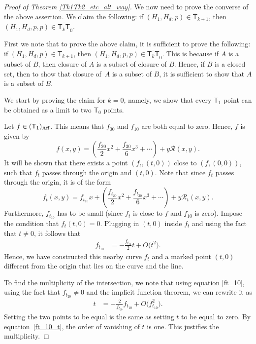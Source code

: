 \begin{proof}[Proof of Theorem \ref{Tk1Tk2_etc_alt_way}]
We now need to prove the converse of the above assertion.
We claim the following: if $(H_1, H_d, p) \in \overline{\mathsf{T}}_{k+1}$,
then $(H_1, H_d, p, p) \in \overline{\mathsf{T}_{k} \mathsf{T}}_0$.

First we note that to prove the above claim, it is sufficient to prove the following:
if $(H_1, H_d, p) \in \mathsf{T}_{k+1}$,
then $(H_1, H_d, p, p) \in \overline{\mathsf{T}_{k} \mathsf{T}}_0$.
This is because if $A$ is a subset of $B$, then closure of $A$ is a subset of
closure of $B$. Hence, if $B$ is a closed set, then to show that closure of~$A$
is a subset of $B$, it is sufficient to show that $A$ is a subset of $B$.

We start by proving the claim for $k = 0$, namely, we show that
every $\mathsf{T}_1$ point can be obtained as a limit to two $\mathsf{T}_0$ points.

Let $f \in (\mathsf{T}_1)_{\textnormal{Aff}}$. This means that $f_{00}$ and $f_{10}$ are both equal to zero.
Hence, $f$ is given by
\[
f(x, y)  =  \left(\frac{f_{20}}{2} x^2 + \frac{f_{30}}{6} x^3 + \cdots\right) + y \mathcal{R}(x, y).
\]
It will be shown that there exists a point $(f_t, (t, 0))$ close to $(f, (0, 0))$, such that
$f_t$ passes through the origin and $(t, 0)$. Note that
since $f_t$ passes through the origin, it is of the form
\[
f_t(x, y) = f_{t_{10}}x+ \left(\frac{f_{t_{20}}}{2} x^2 + \frac{f_{t_{30}}}{6} x^3 +\cdots\right) +
y \mathcal{R}_t(x, y).
\]
Furthermore, $f_{t_{10}}$ has to be small (since $f_t$ is close to $f$ and $f_{10}$ is zero).
Impose the condition that $f_{t}(t, 0) = 0$. Plugging in $(t, 0)$ inside $f_t$ and using the fact
that $t \neq 0$, it follows that
\begin{align}
f_{t_{10}}&= -\frac{f_{t_{20}}}{2} t + O\bigl(t^2\bigr). \label{ft_10}
\end{align}
Hence, we have constructed this nearby curve $f_t$ and a marked point $(t, 0)$ different from the origin
that lies on the curve and the line.

To find the multiplicity of the intersection, we note that using equation \eqref{ft_10},
using the fact that $f_{t_{20}} \neq 0$
and the implicit function theorem, we can rewrite it as
\begin{align}
t & = -\frac{2}{f_{t_{20}}} f_{t_{10}} + O\bigl(f_{t_{10}}^2\bigr). \label{ft_10_t}
\end{align}
Setting the two points to be equal is the same as setting $t$ to be equal to zero.
By equation~\eqref{ft_10_t}, the order of vanishing of $t$ is one. This
justifies the multiplicity.


\end{proof}
